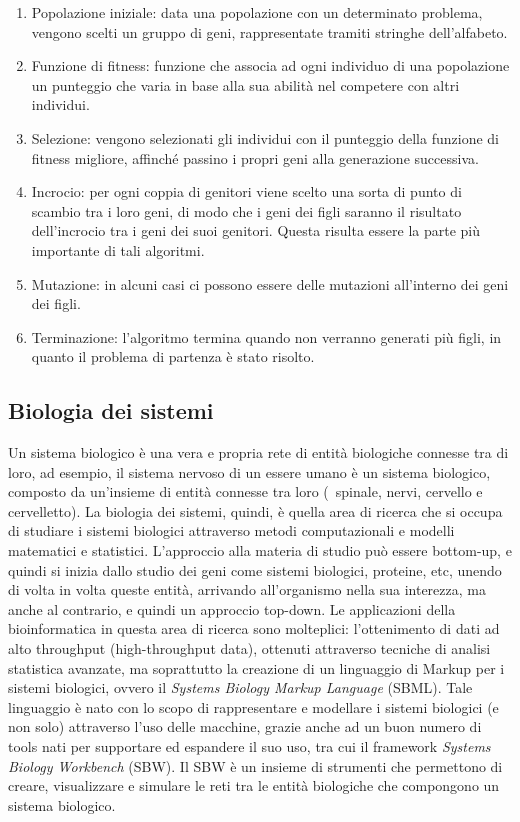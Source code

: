 \begin{enumerate}
	\item Popolazione iniziale: data una popolazione con un determinato problema, vengono scelti un gruppo di geni, rappresentate tramiti stringhe dell'alfabeto.
	\item Funzione di fitness: funzione che associa ad ogni individuo di una popolazione un punteggio che varia in base alla sua abilità nel competere con altri individui.
	\item Selezione: vengono selezionati gli individui con il punteggio della funzione di fitness migliore, affinché passino i propri geni alla generazione successiva.
	\item Incrocio: per ogni coppia di genitori viene scelto una sorta di punto di scambio tra i loro geni, di modo che i geni dei figli saranno il risultato dell'incrocio tra i geni dei suoi genitori. Questa risulta essere la parte più importante di tali algoritmi.
	\item Mutazione: in alcuni casi ci possono essere delle mutazioni all'interno dei geni dei figli.
	\item Terminazione: l'algoritmo termina quando non verranno generati più figli, in quanto il problema di partenza è stato risolto.
\end{enumerate}

\subsection{Biologia dei sistemi}
Un sistema biologico è una vera e propria rete di entità biologiche connesse tra di loro, ad esempio, il sistema nervoso di un essere umano è un sistema biologico, composto da un'insieme di entità connesse tra loro (\ spinale, nervi, cervello e cervelletto).
\newline
La biologia dei sistemi, quindi, è quella area di ricerca che si occupa di studiare i sistemi biologici attraverso metodi computazionali e modelli matematici e statistici. L'approccio alla materia di studio può essere bottom-up, e quindi si inizia dallo studio dei geni come sistemi biologici, proteine, etc, unendo di volta in volta queste entità, arrivando all'organismo nella sua interezza, ma anche al contrario, e quindi un approccio top-down.
\newline
Le applicazioni della bioinformatica in questa area di ricerca sono molteplici: l'ottenimento di dati ad alto throughput (high-throughput data), ottenuti attraverso tecniche di analisi statistica avanzate, ma soprattutto la creazione di un linguaggio di Markup per i sistemi biologici, ovvero il \textit{Systems Biology Markup Language} (SBML)\cite{SBML}. Tale linguaggio è nato con lo scopo di rappresentare e modellare i sistemi biologici (e non solo) attraverso l'uso delle macchine, grazie anche ad un buon numero di tools nati per supportare ed espandere il suo uso, tra cui il framework \textit{Systems Biology Workbench} (SBW)\cite{SBW}. Il SBW è un insieme di strumenti che permettono di creare, visualizzare e simulare le reti tra le entità biologiche che compongono un sistema biologico.

